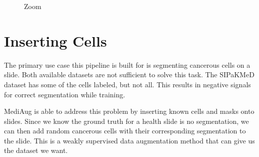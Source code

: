 \documentclass[ms,electronic,oneside,twosidetoc,letterpaper,chaptercenter,parttop]{byumsphd}
\begin{document}
\begin{figure}[H]
  \centering
   \quad
   \quad
   \quad
   \quad
  \caption{Zoom}
\end{figure}

\section{Inserting Cells}

The primary use case this pipeline is built for is segmenting cancerous cells on a slide.
Both available datasets are not sufficient to solve this task. The SIPaKMeD dataset has some
of the cells labeled, but not all. This results in negative signals for correct segmentation
while training.

MediAug is able to address this problem by inserting known cells and masks onto slides.
Since we know the ground truth for a health slide is no segmentation, we can then add 
random cancerous cells with their corresponding segmentation to the slide. This is a weakly 
supervised data augmentation method that can give us the dataset we want.
\end{document}
